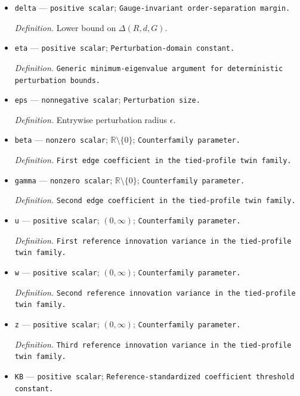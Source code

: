 \documentclass{article}
\begin{document}
\begin{itemize}
  \par\smallskip\noindent\emph{Definition.} Minimum nonzero entry of the true reference-standardized matrix \(B^0\).
  \item \texttt{delta} --- \texttt{positive scalar}; \texttt{Gauge-\allowbreak{}invariant order-\allowbreak{}separation margin.}
  \par\smallskip\noindent\emph{Definition.} Lower bound on \(\Delta(R,d,G)\).
  \item \texttt{eta} --- \texttt{positive scalar}; \texttt{Perturbation-\allowbreak{}domain constant.}
  \par\smallskip\noindent\emph{Definition.} \texttt{Generic minimum-\allowbreak{}eigenvalue argument for deterministic perturbation bounds.}
  \item \texttt{eps} --- \texttt{nonnegative scalar}; \texttt{Perturbation size.}
  \par\smallskip\noindent\emph{Definition.} Entrywise perturbation radius \(\epsilon\).
  \item \texttt{beta} --- \texttt{nonzero scalar}; \(\mathbb R\setminus\{0\}\); \texttt{Counterfamily parameter.}
  \par\smallskip\noindent\emph{Definition.} \texttt{First edge coefficient in the tied-\allowbreak{}profile twin family.}
  \item \texttt{gamma} --- \texttt{nonzero scalar}; \(\mathbb R\setminus\{0\}\); \texttt{Counterfamily parameter.}
  \par\smallskip\noindent\emph{Definition.} \texttt{Second edge coefficient in the tied-\allowbreak{}profile twin family.}
  \item \texttt{u} --- \texttt{positive scalar}; \((0,\infty)\); \texttt{Counterfamily parameter.}
  \par\smallskip\noindent\emph{Definition.} \texttt{First reference innovation variance in the tied-\allowbreak{}profile twin family.}
  \item \texttt{w} --- \texttt{positive scalar}; \((0,\infty)\); \texttt{Counterfamily parameter.}
  \par\smallskip\noindent\emph{Definition.} \texttt{Second reference innovation variance in the tied-\allowbreak{}profile twin family.}
  \item \texttt{z} --- \texttt{positive scalar}; \((0,\infty)\); \texttt{Counterfamily parameter.}
  \par\smallskip\noindent\emph{Definition.} \texttt{Third reference innovation variance in the tied-\allowbreak{}profile twin family.}
  \item \texttt{KB} --- \texttt{positive scalar}; \texttt{Reference-\allowbreak{}standardized coefficient threshold constant.}

\end{itemize}
\end{document}
